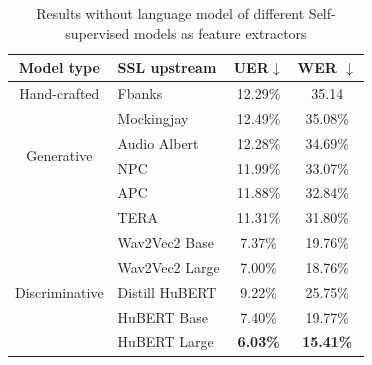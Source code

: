 \begin{table}[ht]
  \centering
  \begin{tabular}{clcc}
  \hline
  Model type                      &  SSL upstream    & UER$\downarrow$ & WER $\downarrow$ \\ \hline
  Hand-crafted                    & Fbanks         & 12.29\%                                                           & 35.14            \\ \hline
  \multirow{4}{*}{Generative}     & Mockingjay     & 12.49\%                                                           & 35.08\%          \\
                                  & Audio Albert   & 12.28\%                                                           & 34.69\%          \\
                                  & NPC   & 11.99\%                                                           & 33.07\%          \\
                                  & APC            & 11.88\%                                                           & 32.84\%          \\
                                  & TERA           & 11.31\%                                                           & 31.80\%          \\ \hline
  \multirow{5}{*}{Discriminative} & Wav2Vec2 Base  & 7.37\%                                                            & 19.76\%          \\
                                  & Wav2Vec2 Large & 7.00\%                                                            & 18.76\%          \\
                                  & Distill HuBERT & 9.22\%                                                            & 25.75\%          \\
                                  & HuBERT Base    & 7.40\%                                                            & 19.77\%          \\
                                  & HuBERT Large   & \textbf{6.03\%}                                                   & \textbf{15.41\%} \\ \hline
  \end{tabular}
  \caption{Results without language model of different Self-supervised models as feature extractors}
\label{tab:SSL}
  \end{table}

